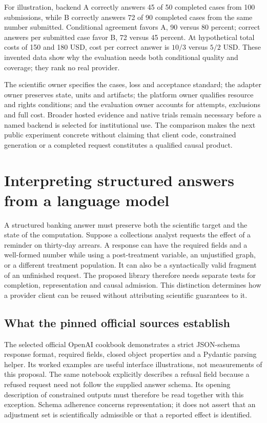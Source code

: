 For illustration, backend A correctly answers 45 of 50 completed cases from
100 submissions, while B correctly answers 72 of 90 completed cases from
the same number submitted. Conditional agreement favors A, 90 versus
80 percent; correct answers per submitted case favor B, 72 versus 45 percent.
At hypothetical total costs of 150 and 180 USD, cost per correct answer is
$10/3$ versus $5/2$ USD. These invented data show why the evaluation needs
both conditional quality and coverage; they rank no real provider.
\citep{exec24_backend_reference}

The scientific owner specifies the cases, loss and acceptance standard;
the adapter owner preserves state, units and artifacts; the platform owner
qualifies resource and rights conditions; and the evaluation owner accounts
for attempts, exclusions and full cost. Broader hosted evidence and native
trials remain necessary before a named backend is selected for institutional
use. The comparison makes the next public experiment concrete without
claiming that client code, constrained generation or a completed request
constitutes a qualified causal product.
\citep{exec24_backend_reference}


\section[Structured outputs and scientific admission]{Interpreting structured answers from a language model}
\label{sec:exec28-oa}
A structured banking answer must preserve both the scientific target and the state of the computation.
Suppose a collections analyst requests the effect of a reminder on thirty-day arrears. A response can have
the required fields and a well-formed number while using a post-treatment variable, an unjustified graph,
or a different treatment population. It can also be a syntactically valid fragment of an unfinished request.
The proposed library therefore needs separate tests for completion, representation and causal admission.
This distinction determines how a provider client can be reused without attributing scientific guarantees to it.

\subsection{What the pinned official sources establish}
The selected official OpenAI cookbook demonstrates a strict JSON-schema response format, required fields,
closed object properties and a Pydantic parsing helper. Its worked examples are useful interface illustrations,
not measurements of this proposal. The same notebook explicitly describes a refusal field because a refused
request need not follow the supplied answer schema. Its opening description of constrained outputs must
therefore be read together with this exception. Schema adherence concerns representation; it does not assert
that an adjustment set is scientifically admissible or that a reported effect is identified.~\citep{exec28_oa_cookbook}

